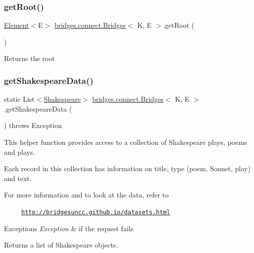 \subsubsection{\texorpdfstring{get\+Root()}{getRoot()}}
{\footnotesize\ttfamily \hyperlink{classbridges_1_1base_1_1_element}{Element}$<$E$>$ \hyperlink{classbridges_1_1connect_1_1_bridges}{bridges.\+connect.\+Bridges}$<$ K, E $>$.get\+Root (\begin{DoxyParamCaption}{ }\end{DoxyParamCaption})}

\begin{DoxyReturn}{Returns}
the root 
\end{DoxyReturn}
\hypertarget{classbridges_1_1connect_1_1_bridges_a03ba87a09742cfb40f357253239006e6}{}\label{classbridges_1_1connect_1_1_bridges_a03ba87a09742cfb40f357253239006e6} 
\subsubsection{\texorpdfstring{get\+Shakespeare\+Data()}{getShakespeareData()}}
{\footnotesize\ttfamily static List$<$\hyperlink{classbridges_1_1data__src__dependent_1_1_shakespeare}{Shakespeare}$>$ \hyperlink{classbridges_1_1connect_1_1_bridges}{bridges.\+connect.\+Bridges}$<$ K, E $>$.get\+Shakespeare\+Data (\begin{DoxyParamCaption}{ }\end{DoxyParamCaption}) throws Exception\hspace{0.3cm}{\ttfamily [static]}}

This helper function provides access to a collection of Shakespeare plays, poems and plays.

Each record in this collection has information on title, type (poem, Sonnet, play) and text. ~\newline


For more information and to look at the data, refer to 

~~~~~\href{http://bridgesuncc.github.io/datasets.html}{\tt http\+://bridgesuncc.\+github.\+io/datasets.\+html} 


\begin{DoxyExceptions}{Exceptions}
{\em Exception} & if the request fails\\
\hline
\end{DoxyExceptions}
\begin{DoxyReturn}{Returns}
a list of Shakespeare objects. 
\end{DoxyReturn}
\hypertarget{classbridges_1_1connect_1_1_bridges_a5ff3fdd97d4c71c9c2141c3355e417aa}{}\label{classbridges_1_1connect_1_1_bridges_a5ff3fdd97d4c71c9c2141c3355e417aa} 
